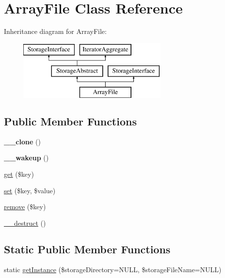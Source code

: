 \hypertarget{class_pes_1_1_storage_1_1_array_file}{}\section{Array\+File Class Reference}
\label{class_pes_1_1_storage_1_1_array_file}
Inheritance diagram for Array\+File\+:\begin{figure}[H]
\begin{center}
\leavevmode
\includegraphics[height=3.000000cm]{class_pes_1_1_storage_1_1_array_file}
\end{center}
\end{figure}
\subsection*{Public Member Functions}
\begin{DoxyCompactItemize}
\item 
\mbox{\label{class_pes_1_1_storage_1_1_array_file_ad0cb87b388bc74d63dc884accdca8713}} 
{\bfseries \+\_\+\+\_\+clone} ()
\item 
\mbox{\label{class_pes_1_1_storage_1_1_array_file_a19dd44fe063cfd1cbafe97452e57666c}} 
{\bfseries \+\_\+\+\_\+wakeup} ()
\item 
\mbox{\hyperlink{class_pes_1_1_storage_1_1_array_file_a24a9bf83a1002d46ece83a93d14bd921}{get}} (\$key)
\item 
\mbox{\hyperlink{class_pes_1_1_storage_1_1_array_file_aab787bd83f84f4215dceb35f7c305eee}{set}} (\$key, \$value)
\item 
\mbox{\hyperlink{class_pes_1_1_storage_1_1_array_file_a95483af4e2c07dc9893fe058b026bd5d}{remove}} (\$key)
\item 
\mbox{\hyperlink{class_pes_1_1_storage_1_1_array_file_a421831a265621325e1fdd19aace0c758}{\+\_\+\+\_\+destruct}} ()
\end{DoxyCompactItemize}
\subsection*{Static Public Member Functions}
\begin{DoxyCompactItemize}
\item 
static \mbox{\hyperlink{class_pes_1_1_storage_1_1_array_file_a08fb2636fbdda74d4a1f1c65a47d05eb}{get\+Instance}} (\$storage\+Directory=N\+U\+LL, \$storage\+File\+Name=N\+U\+LL)
\end{DoxyCompactItemize}
